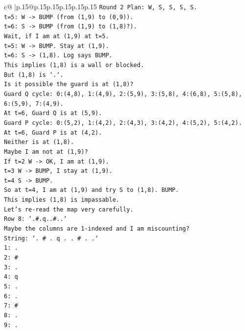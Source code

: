 \documentclass{article}
\begin{document}
{\begin{supertabular}{c@{$\;$}|p{.15\linewidth}@{}p{.15\linewidth}p{.15\linewidth}p{.15\linewidth}p{.15\linewidth}p{.15\linewidth}}
{{{\texttt{Round 2 Plan: W, S, S, S, S.} \\
\texttt{t=5: W {-}> BUMP (from (1,9) to (0,9)).} \\
\texttt{t=6: S {-}> BUMP (from (1,9) to (1,8)?).} \\
\texttt{Wait, if I am at (1,9) at t=5.} \\
\texttt{t=5: W {-}> BUMP. Stay at (1,9).} \\
\texttt{t=6: S {-}> (1,8). Log says BUMP.} \\
\texttt{This implies (1,8) is a wall or blocked.} \\
\texttt{But (1,8) is `.`.} \\
\texttt{Is it possible the guard is at (1,8)?} \\
\texttt{Guard Q cycle: 0:(4,8), 1:(4,9), 2:(5,9), 3:(5,8), 4:(6,8), 5:(5,8), 6:(5,9), 7:(4,9).} \\
\texttt{At t=6, Guard Q is at (5,9).} \\
\texttt{Guard P cycle: 0:(5,2), 1:(4,2), 2:(4,3), 3:(4,2), 4:(5,2), 5:(4,2).} \\
\texttt{At t=6, Guard P is at (4,2).} \\
\texttt{Neither is at (1,8).} \\
\texttt{Maybe I am not at (1,9)?} \\
\texttt{If t=2 W {-}> OK, I am at (1,9).} \\
\texttt{t=3 W {-}> BUMP, I stay at (1,9).} \\
\texttt{t=4 S {-}> BUMP.} \\
\texttt{So at t=4, I am at (1,9) and try S to (1,8). BUMP.} \\
\texttt{This implies (1,8) is impassable.} \\
\texttt{Let's re{-}read the map very carefully.} \\
\texttt{Row 8: `.\#.q..\#..`} \\
\texttt{Maybe the columns are 1{-}indexed and I am miscounting?} \\
\texttt{String: `. \# . q . . \# . .`} \\
\texttt{1: .} \\
\texttt{2: \#} \\
\texttt{3: .} \\
\texttt{4: q} \\
\texttt{5: .} \\
\texttt{6: .} \\
\texttt{7: \#} \\
\texttt{8: .} \\
\texttt{9: .} \\
}}}
\end{supertabular}}
\end{document}
